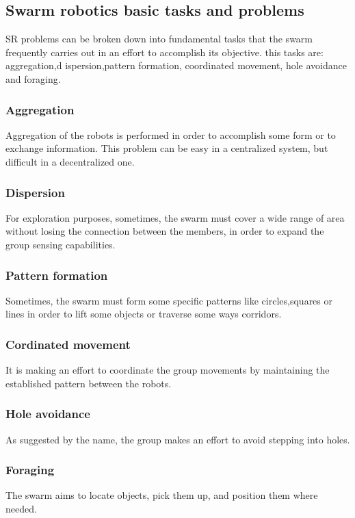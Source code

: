 \documentclass[12pt]{article}
\begin{document}
\subsection{Swarm robotics basic tasks and problems}
SR problems can be broken down into fundamental tasks that the swarm frequently carries out in an effort to accomplish its objective.
this tasks are: aggregation,d ispersion,pattern formation, coordinated
movement, hole avoidance and foraging\cite{bayindir2007review}\cite{navarro2013introduction}.
\newpage
\subsubsection{Aggregation}
Aggregation of the robots is performed in order to accomplish some form or to exchange information. This problem can be easy in a centralized system, but  difficult in a decentralized one.
\subsubsection{Dispersion}
For exploration purposes, sometimes, the swarm must cover a wide range of area without losing the connection between the members, in order to expand the group sensing capabilities. 

\subsubsection{Pattern formation}
Sometimes, the swarm must form some specific patterns like circles,squares or  lines in order to lift some objects or traverse some ways corridors.
\subsubsection{Cordinated movement}
It is making an effort to coordinate the group movements by maintaining the established pattern between the robots.
\subsubsection{Hole avoidance}
As suggested by the name, the group makes an effort to avoid stepping into holes.
\subsubsection{Foraging}
The swarm aims to locate objects, pick them up, and position them where needed.

\newpage


\end{document}
